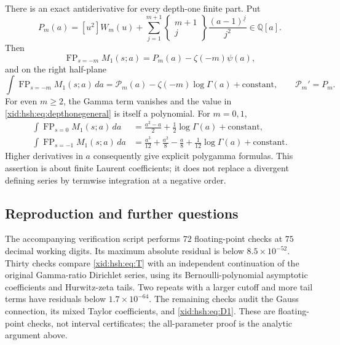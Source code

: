 \documentclass[11pt,a4paper]{article}
\numberwithin{equation}{section}
\theoremstyle{definition}
\theoremstyle{remark}
\begin{document}
There is an exact antiderivative for every depth-one finite part. Put
\[
 P_m(a)=[u^2]W_m(u)+
       \sum_{j=1}^{m+1}{\left\{\begin{matrix}m+1\\j\end{matrix}\right\}}
                 \frac{(a-1)^{\underline j}}{j^2}\in\mathbb Q[a].
\]
Then
\begin{equation}\label{xid:hsh:eq:depthonegeneral}
 \operatorname{FP}_{s=-m}M_1(s;a)
       =P_m(a)-\zeta(-m)\psi(a),
\end{equation}
and on the right half-plane
\begin{equation}\label{xid:hsh:eq:primitive}
 \int\operatorname{FP}_{s=-m}M_1(s;a)\,da
       =\mathcal P_m(a)-\zeta(-m)\log\Gamma(a)+\text{constant},
 \qquad \mathcal P_m'=P_m.
\end{equation}
For even $m\ge2$, the Gamma term vanishes and the value in
\eqref{xid:hsh:eq:depthonegeneral} is itself a polynomial. For $m=0,1$,
\begin{align*}
 \int\operatorname{FP}_{s=0}M_1(s;a)\,da
       &=\frac{a^2-a}{2}+\frac12\log\Gamma(a)+\text{constant},\\
 \int\operatorname{FP}_{s=-1}M_1(s;a)\,da
       &=\frac{a^3}{12}+\frac{a^2}{8}-\frac a8
                      +\frac1{12}\log\Gamma(a)+\text{constant}.
\end{align*}
Higher derivatives in $a$ consequently give explicit polygamma formulas.
This assertion is about finite Laurent coefficients; it does not replace
a divergent defining series by termwise integration at a negative order.

\subsection{Reproduction and further questions}

The accompanying verification script performs $72$ floating-point checks
at $75$ decimal working digits. Its maximum absolute residual is below
$8.5\times10^{-52}$. Thirty checks compare \eqref{xid:hsh:eq:T} with an
independent continuation of the original Gamma-ratio Dirichlet series,
using its Bernoulli-polynomial asymptotic coefficients and Hurwitz-zeta
tails. Two repeats with a larger cutoff and more tail terms have residuals
below $1.7\times10^{-64}$. The remaining checks audit the Gauss connection,
its mixed Taylor coefficients, and \eqref{xid:hsh:eq:D1}. These are
floating-point checks, not interval certificates; the all-parameter
proof is the analytic argument above.
\end{document}
